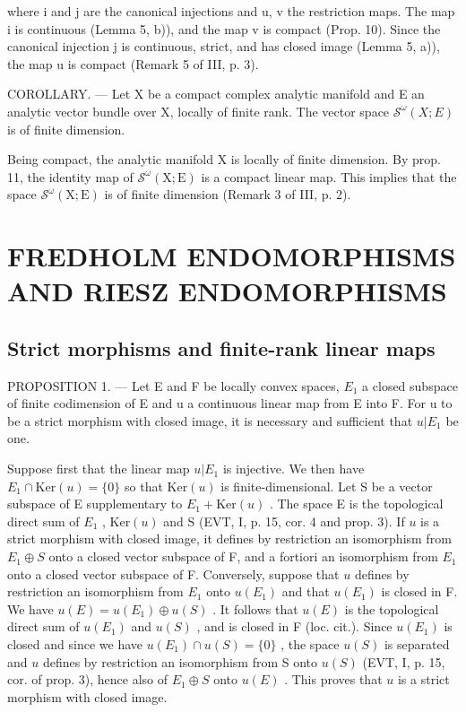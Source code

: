 where i and j are the canonical injections and u, v the restriction maps. The map i is continuous (Lemma 5, b)), and the map v is compact (Prop. 10). Since the canonical injection j is continuous, strict, and has closed image (Lemma 5, a)), the map u is compact (Remark 5 of III, p. 3).

COROLLARY. --- Let X be a compact complex analytic manifold and E an analytic vector bundle over X, locally of finite rank. The vector space \(\mathcal{S}^{\omega}(X;E)\) is of finite dimension.

Being compact, the analytic manifold X is locally of finite dimension. By prop. 11, the identity map of \(\mathcal{S}^{\omega}(\mathrm{X};\mathrm{E})\) is a compact linear map. This implies that the space \(\mathcal{S}^{\omega}(\mathrm{X};\mathrm{E})\) is of finite dimension (Remark 3 of III, p. 2).

\section{FREDHOLM ENDOMORPHISMS AND RIESZ ENDOMORPHISMS}

\subsection{Strict morphisms and finite-rank linear maps}

PROPOSITION 1. --- Let E and F be locally convex spaces, \(E_{1}\) a closed subspace of finite codimension of E and u a continuous linear map from E into F. For u to be a strict morphism with closed image, it is necessary and sufficient that \(u|E_{1}\) be one.

Suppose first that the linear map \(u|E_1\) is injective. We then have \(E_1 \cap \text{Ker}(u) = \{0\}\) so that \(\text{Ker}(u)\) is finite-dimensional. Let S be a vector subspace of E supplementary to \(E_1 + \text{Ker}(u)\) . The space E is the topological direct sum of \(E_1\) , \(\text{Ker}(u)\) and S (EVT, I, p. 15, cor. 4 and prop. 3). If \(u\) is a strict morphism with closed image, it defines by restriction an isomorphism from \(E_1 \oplus S\) onto a closed vector subspace of F, and a fortiori an isomorphism from \(E_1\) onto a closed vector subspace of F. Conversely, suppose that \(u\) defines by restriction an isomorphism from \(E_1\) onto \(u(E_1)\) and that \(u(E_1)\) is closed in F. We have \(u(E) = u(E_1) \oplus u(S)\) . It follows that \(u(E)\) is the topological direct sum of \(u(E_1)\) and \(u(S)\) , and is closed in F (loc. cit.). Since \(u(E_1)\) is closed and since we have \(u(E_1) \cap u(S) = \{0\}\) , the space \(u(S)\) is separated and \(u\) defines by restriction an isomorphism from S onto \(u(S)\) (EVT, I, p. 15, cor. of prop. 3), hence also of \(E_1 \oplus S\) onto \(u(E)\) . This proves that \(u\) is a strict morphism with closed image.

